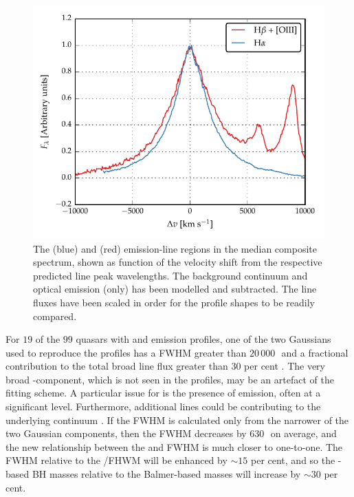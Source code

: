 \begin{figure}
    \centering 
    \includegraphics[width=0.8\linewidth]{figures/chapter03/ha_hb_composite.pdf} 
    \caption[{The \ha and \hb emission-line regions in the median composite spectrum.}]{The \ha (blue) and \hb (red) emission-line regions in the median composite spectrum, shown as function of the velocity shift from the respective predicted line peak wavelengths. The background continuum and optical  emission (\hb only) has been modelled and subtracted. The line fluxes have been scaled in order for the profile shapes to be readily compared.}
    \label{fig:balmer_composite}
\end{figure}

For $19$ of the $99$ quasars with \hb and \ha emission profiles, one of the two Gaussians used to reproduce the \hb profiles has a FWHM greater than $20$\,$000$\,\kms\, and a fractional contribution to the total \hb broad line flux greater than $30$ per cent \citep{marziani09,marziani13}.  
The very broad \hbns-component, which is not seen in the \ha profiles, may be an artefact of the fitting scheme.
A particular issue for \hb is the presence of  emission, often at a significant level.
Furthermore, additional lines could be contributing to the underlying continuum \citep[e.g. the \ll$4922$,$5017$ doublet;][]{veron02,zamfir10}. 
If the \hb FWHM is calculated only from the narrower of the two Gaussian components, then the \hb FWHM decreases by $630$\,\kms\, on average, and the new relationship between the \ha and \hb FWHM is much closer to one-to-one. 
The  FWHM relative to the \hans/\hb FHWM will be enhanced by $\sim15$ per cent, and so the -based BH masses relative to the Balmer-based masses will increase by $\sim30$ per cent. 

